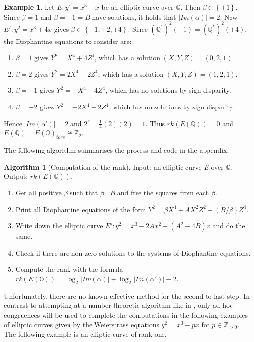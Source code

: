 \documentclass{article}
\newcommand{\Z}{\mathbb{Z}}
\newcommand{\Q}{\mathbb{Q}}
\newcommand{\rb}[1]{\left( #1 \right)}
\newcommand{\cb}[1]{\left\{ #1 \right\}}
\newcommand{\abs}[1]{\left\lvert #1 \right\rvert}
\theoremstyle{definition}
\newtheorem*{example}{Example}
\newtheorem{algorithm}[proposition]{Algorithm}
\begin{document}
\begin{example}
Let $ E : y^2 = x^3 - x $ be an elliptic curve over $ \Q $. Then $ \beta \in \cb{\pm 1} $. Since $ \beta = 1 $ and $ \beta = -1 = B $ have solutions, it holds that $ \abs{Im\rb{\alpha}} = 2 $. Now $ E' : y^2 = x^3 + 4x $ gives $ \beta \in \cb{\pm 1, \pm 2, \pm 4} $. Since $ \rb{\Q^*}^2\rb{\pm 1} = \rb{\Q^*}^2\rb{\pm 4} $, the Diophantine equations to consider are:
\begin{enumerate}
\item $ \beta = 1 $ gives $ Y^2 = X^4 + 4Z^4 $, which has a solution $ \rb{X, Y, Z} = \rb{0, 2, 1} $.
\item $ \beta = 2 $ gives $ Y^2 = 2X^4 + 2Z^4 $, which has a solution $ \rb{X, Y, Z} = \rb{1, 2, 1} $.
\item $ \beta = -1 $ gives $ Y^2 = -X^4 - 4Z^4 $, which has no solutions by sign disparity.
\item $ \beta = -2 $ gives $ Y^2 = -2X^4 - 2Z^4 $, which has no solutions by sign disparity.
\end{enumerate}
Hence $ \abs{Im\rb{\alpha'}} = 2 $ and $ 2^r = \tfrac{1}{4}\rb{2}\rb{2} = 1 $. Thus $ rk\rb{E\rb{\Q}} = 0 $ and $ E\rb{\Q} = E\rb{\Q}_{tors} \cong \Z_2 $.
\end{example}

The following algorithm summarises the process and code in the appendix.

\begin{algorithm}[Computation of the rank]
Input: an elliptic curve $ E $ over $ \Q $. Output: $ rk\rb{E\rb{\Q}} $.
\begin{enumerate}
\item Get all positive $ \beta $ such that $ \beta \mid B $ and free the squares from each $ \beta $.
\item Print all Diophantine equations of the form $ Y^2 = \beta X^4 + AX^2Z^2 + \rb{B / \beta}Z^4 $.
\item Write down the elliptic curve $ E' : y^2 = x^3 - 2Ax^2 + \rb{A^2 - 4B}x $ and do the same.
\item Check if there are non-zero solutions to the systems of Diophantine equations.
\item Compute the rank with the formula $ rk\rb{E\rb{\Q}} = \log_2\abs{Im\rb{\alpha}} + \log_2\abs{Im\rb{\alpha'}} - 2 $.
\end{enumerate}
\end{algorithm}

Unfortunately, there are no known effective method for the second to last step. In contrast to attempting at a number theoretic algorithm like in \cite{rank}, only ad-hoc congruences will be used to complete the computations in the following examples of elliptic curves given by the Weierstrass equations $ y^2 = x^3 - px $ for $ p \in \Z_{> 0} $. The following example is an elliptic curve of rank one.
\end{document}
